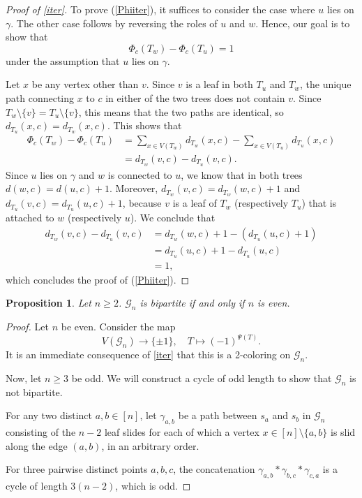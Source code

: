 \documentclass[reqno,dvipsnames]{amsart}
\theoremstyle{plain}
\newtheorem{proposition}[theorem]{Proposition}
\numberwithin{equation}{section}
\theoremstyle{definition}
\begin{document}
\begin{proof}[Proof of \autoref{iter}]
	To prove (\ref{Phiiter}), it suffices to consider the case where $u$ lies on $\gamma$. The other case follows by reversing the roles of $u$ and $w$. Hence, our goal is to show that 
	\[
	\Phi_c(T_w) - \Phi_c(T_u) = 1
	\]
	under the assumption that $u$ lies on $\gamma$.

	Let $x$ be any vertex other than $v$. Since $v$ is a leaf in both $T_u$ and $T_w$, the unique path connecting $x$ to $c$ in either of the two trees does not contain $v$. Since $T_w \setminus \{v\} = T_u \setminus \{v\}$, this means that the two paths are identical, so $d_{T_u}(x,c) = d_{T_w}(x,c)$. This shows that
	\[
	\begin{split}
		\Phi_c(T_w) - \Phi_c(T_u) &= \sum_{x\in V(T_w)}d_{T_w}(x,c) - \sum_{x\in V(T_u)}d_{T_u}(x,c)\\
		&= d_{T_w}(v,c) - d_{T_u}(v,c).
	\end{split}
	\]
	Since $u$ lies on $\gamma$ and $w$ is connected to $u$, we know that in both trees $d(w,c) = d(u,c) +1$. Moreover, $d_{T_w}(v,c) = d_{T_w}(w,c) + 1$ and $d_{T_u}(v,c) = d_{T_u}(u,c) +1$, because $v$ is a leaf of $T_w$ (respectively $T_u$) that is attached to $w$ (respectively $u$). We conclude that 
	\[
	\begin{split}
		d_{T_w}(v,c) - d_{T_u}(v,c) &= d_{T_w}(w,c) + 1 - ( d_{T_u}(u,c) + 1)\\
		&= d_{T_u}(u,c) + 1 - d_{T_u}(u,c)\\
		&= 1,
	\end{split}
	\]
	which concludes the proof of (\ref{Phiiter}).
\end{proof}


\begin{proposition}
	Let $n\geq 2$. $\mathcal{G}_n$ is bipartite if and only if $n$ is even.
\end{proposition}

\begin{proof}
	Let $n$ be even. Consider the map 
	\[
	V(\mathcal{G}_n)\to \{\pm 1\}, \quad T\mapsto (-1)^{\Psi(T)}.
	\] 
	It is an immediate consequence of \autoref{iter} that this is a 2-coloring on $\mathcal{G}_n$.

	Now, let $n\geq 3$ be odd. We will construct a cycle of odd length to show that $\mathcal{G}_n$ is not bipartite.

	For any two distinct $a,b\in [n]$, let $\gamma_{a,b}$ be a path between $s_a$ and $s_b$ in $\mathcal{G}_n$ consisting of the $n-2$ leaf slides for each of which a vertex $x\in [n]\setminus \{a,b\}$ is slid along the edge $(a,b)$, in an arbitrary order.

	For three pairwise distinct points $a,b,c$, the concatenation $\gamma_{a,b} * \gamma_{b,c} * \gamma_{c,a}$ is a cycle of length $3(n-2)$, which is odd.
\end{proof}
\end{document}
